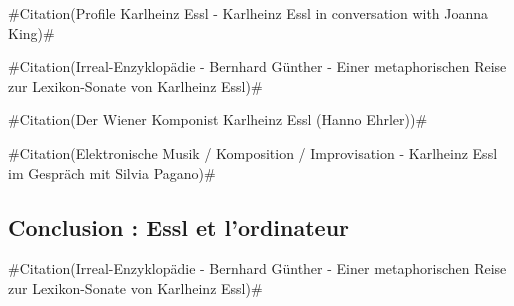 \documentclass[a4paper,12pt]{article}
\newcommand{\zitat}[2]{\#Citation(#2)\#}
\begin{document}
\zitat{I want to challenge the listener not just to consume the piece but by listening becoming something like a co-creator, being a partner of the composer and the composition itself.}
{Profile Karlheinz Essl - Karlheinz Essl in conversation with Joanna King}

\zitat{Die Lexikon-Sonate ist voll absurder Situationen; die isolierten Musiksprachfetzen aus der Geschichte der Klaviermusik werden in immer neuen ZUFALLSNACHBARSCHAFTEN zusammengesetzt; sie rufen Erinnerungen hervor, die aber aus dem Kontext gerissen und in eine irrationale Struktur eingebunden werden.}
{Irreal-Enzyklopädie - Bernhard Günther - Einer metaphorischen Reise zur Lexikon-Sonate von Karlheinz Essl}

\zitat{Einer der Ausgangspunkt ist meine Hassliebe zu diesem Instrument, dem Klavier. Ich wurde mit sieben Jahren gezwungen, Klavier zu lernen; ich wollte Blockflöte spielen. Trotzdem war ich am Klavier nie gut. Es war immer frustrierend, zu sehen, dass ich das, was ich im Kopf hatte, auf den Tasten nicht adäquat umsetzen konnte. Meine ersten Kompositionversuche waren natürlich trotzdem Klavierstücke, aber ich habe sonst kein einziges Klavierstück geschrieben bis jetzt, und ich kann mir auch nicht vorstellen, ein Klavierstück zu schreiben. Das einzige, was mir möglich war: Ein Klavierstück zu machen, das ganz absurde Kriterien erfüllt.}
{Der Wiener Komponist Karlheinz Essl (Hanno Ehrler)}

\zitat{Ein Computer wird nie müde. Mit dem Computer kann man eine Musik in Szene setzen, die nie aufhört, das geht mit Musikern natürlich nicht.}
{Elektronische Musik / Komposition / Improvisation - Karlheinz Essl im Gespräch mit Silvia Pagano}

\subsection{Conclusion : Essl et l'ordinateur}

\zitat{Essl nutzt die heutigen Möglichkeiten der TECHNIK als Mittel, musikalische Möglichkeitsstrukturen zu schaffen, die in der Lage sind, unbeliebig Anderes zu realisieren als die Vorstellung des Komponisten.}
{Irreal-Enzyklopädie - Bernhard Günther - Einer metaphorischen Reise zur Lexikon-Sonate von Karlheinz Essl}
\end{document}
